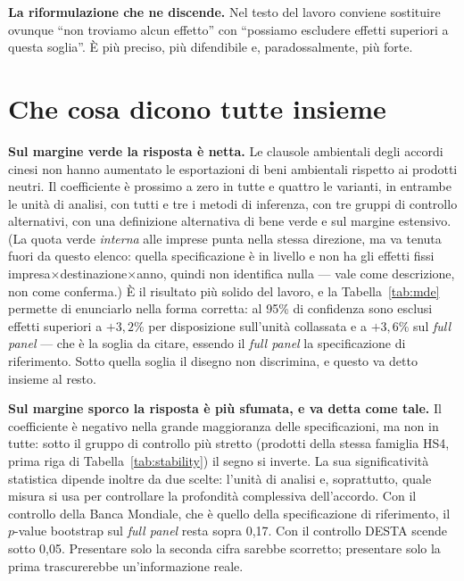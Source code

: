 \documentclass[11pt,a4paper]{article}
\begin{document}
\textbf{La riformulazione che ne discende.} Nel testo del lavoro conviene sostituire
ovunque ``non troviamo alcun effetto'' con ``possiamo escludere effetti superiori a questa
soglia''. \`E pi\`u preciso, pi\`u difendibile e, paradossalmente, pi\`u forte.



\clearpage
\section{Che cosa dicono tutte insieme}

\textbf{Sul margine verde la risposta \`e netta.} Le clausole ambientali degli accordi
cinesi non hanno aumentato le esportazioni di beni ambientali rispetto ai prodotti neutri.
Il coefficiente \`e prossimo a zero in tutte e quattro le varianti, in entrambe le unit\`a
di analisi, con tutti e tre i metodi di inferenza, con tre gruppi di controllo alternativi,
con una definizione alternativa di bene verde e sul margine estensivo. (La quota verde
\emph{interna} alle imprese punta nella stessa direzione, ma va tenuta fuori da questo
elenco: quella specificazione \`e in livello e non ha gli effetti fissi
impresa$\times$destinazione$\times$anno, quindi non identifica nulla --- vale come
descrizione, non come conferma.) \`E il risultato pi\`u solido del lavoro, e la
Tabella~\ref{tab:mde} permette di enunciarlo nella forma corretta: al 95\% di confidenza
sono esclusi effetti superiori a $+3{,}2\%$ per disposizione sull'unit\`a collassata e a
$+3{,}6\%$ sul \emph{full panel} --- che \`e la soglia da citare, essendo il \emph{full
panel} la specificazione di riferimento. Sotto quella soglia il disegno non discrimina, e
questo va detto insieme al resto.

\textbf{Sul margine sporco la risposta \`e pi\`u sfumata, e va detta come tale.} Il
coefficiente \`e negativo nella grande maggioranza delle specificazioni, ma non in tutte:
sotto il gruppo di controllo pi\`u stretto (prodotti della stessa famiglia HS4, prima riga
di Tabella~\ref{tab:stability}) il segno si inverte. La sua significativit\`a statistica
dipende inoltre da due scelte:
l'unit\`a di analisi e, soprattutto, quale misura si usa per controllare la profondit\`a
complessiva dell'accordo. Con il controllo della Banca Mondiale, che \`e quello della
specificazione di riferimento, il $p$-value bootstrap sul \emph{full panel} resta sopra
0,17. Con il controllo DESTA scende sotto 0,05. Presentare solo la seconda cifra sarebbe
scorretto; presentare solo la prima trascurerebbe un'informazione reale.
\end{document}
